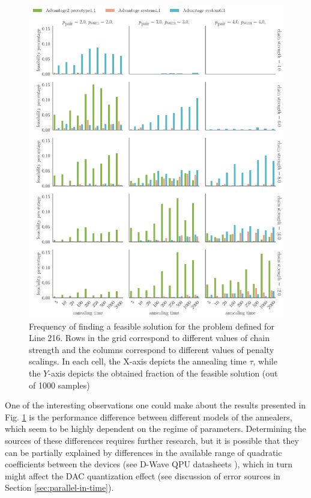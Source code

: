 \begin{figure}
  \includegraphics[width=\textwidth]{figures/dwave_line_216_result.pdf}
  \caption{
    Frequency of finding a feasible solution for the problem defined for Line 216.
    Rows in the grid correspond to different values of chain strength and the
    columns correspond to different values of penalty scalings. In each cell, the
    X-axis depicts the annealing time $\tau$, while the $Y$-axis depicts the
    obtained fraction of the feasible solution (out of 1000 samples) }
  \label{fig:dwline216freq}
\end{figure}

One of the interesting observations one could make about the results presented
in Fig. \ref{fig:dwline216freq} is the performance difference between different
models of the annealers, which seem to be highly dependent on the regime of
parameters. Determining the sources of these differences requires further
research, but it is possible that they can be partially explained by
differences in the available range of quadratic coefficients between the
devices (see D-Wave QPU datasheets \cite{dwavedocs}), which in turn might
affect the DAC quantization effect (see discussion of error sources in Section
\ref{sec:parallel-in-time}).

